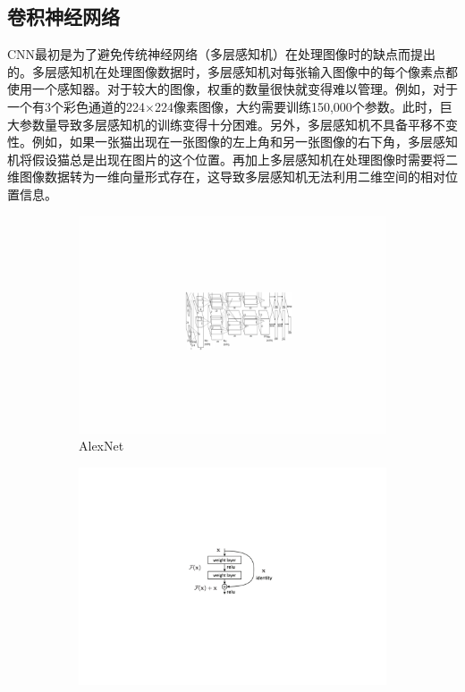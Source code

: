 \subsection{卷积神经网络}\label{subsec:cnn_introduction}
CNN最初是为了避免传统神经网络（多层感知机）在处理图像时的缺点而提出的。多层感知机在处理图像数据时，多层感知机对每张输入图像中的每个像素点都使用一个感知器。对于较大的图像，权重的数量很快就变得难以管理。例如，对于一个有3个彩色通道的224$\times$224像素图像，大约需要训练150,000个参数。此时，巨大参数量导致多层感知机的训练变得十分困难。另外，多层感知机不具备平移不变性。例如，如果一张猫出现在一张图像的左上角和另一张图像的右下角，多层感知机将假设猫总是出现在图片的这个位置。再加上多层感知机在处理图像时需要将二维图像数据转为一维向量形式存在，这导致多层感知机无法利用二维空间的相对位置信息。

\begin{figure}[h!] %
	\centering
	\begin{subfigure}{0.35\textwidth}
		\centering
		\includegraphics[width=1.0\textwidth]{figure/popular_networks_alex_net}
		\caption{AlexNet~\cite{krizhevsky2012imagenet}}
		\label{subfig1}
	\end{subfigure}
	\quad
	\begin{subfigure}{0.336\textwidth}
		\centering
		\includegraphics[width=1.0\textwidth]{figure/popular_networks_resnet}

\end{subfigure}
\end{figure}
